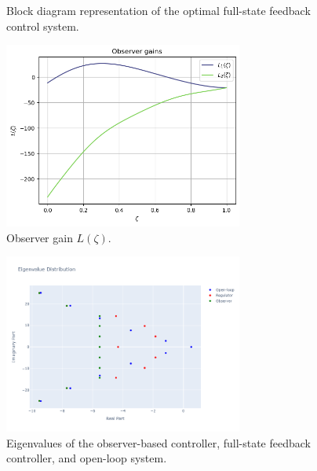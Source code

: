 \begin{figure}[!htbp]
    \centering
    \caption{Block diagram representation of the optimal full-state feedback control system.}
    \label{fig:block_diagram}
\end{figure}

\begin{figure}[!htbp]
    \centering
    \includegraphics[width=0.7\textwidth]{Figures/L.png}
    \caption{Observer gain $L(\zeta)$.}
    \label{fig:L_modes}
\end{figure}

\begin{figure}[!htbp]
    \centering
    \includegraphics*[width=0.7\textwidth]{Figures/pole_placement.png}
    \caption{Eigenvalues of the observer-based controller, full-state feedback controller, and open-loop system.}
    \label{fig:eigs}
\end{figure}

